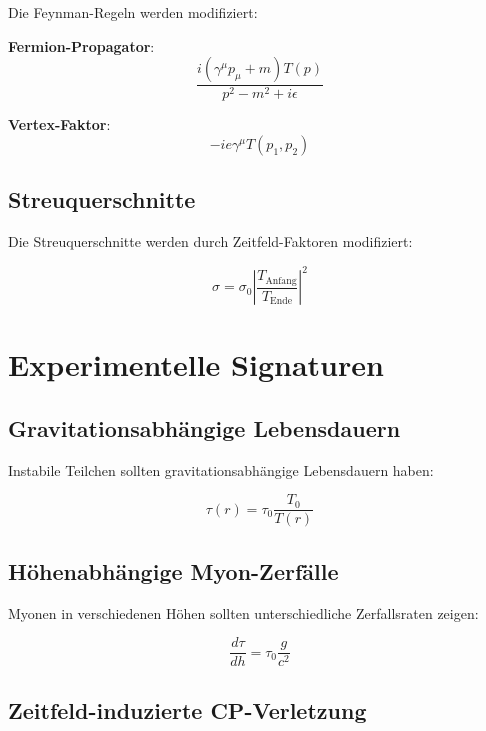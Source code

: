 \documentclass[12pt,a4paper]{report}
\begin{document}
Die Feynman-Regeln werden modifiziert:

\textbf{Fermion-Propagator}:
\begin{equation}
	\frac{i(\gamma^\mu p_\mu + m)T(p)}{p^2 - m^2 + i\epsilon}
\end{equation}

\textbf{Vertex-Faktor}:
\begin{equation}
	-ie\gamma^\mu T(p_1, p_2)
\end{equation}

\subsection{Streuquerschnitte}

Die Streuquerschnitte werden durch Zeitfeld-Faktoren modifiziert:

\begin{equation}
	\sigma = \sigma_0 \left|\frac{T_{\text{Anfang}}}{T_{\text{Ende}}}\right|^2
\end{equation}

\section{Experimentelle Signaturen}

\subsection{Gravitationsabhängige Lebensdauern}

Instabile Teilchen sollten gravitationsabhängige Lebensdauern haben:

\begin{equation}
	\tau(r) = \tau_0 \frac{T_0}{T(r)}
\end{equation}

\subsection{Höhenabhängige Myon-Zerfälle}

Myonen in verschiedenen Höhen sollten unterschiedliche Zerfallsraten zeigen:

\begin{equation}
	\frac{d\tau}{dh} = \tau_0\frac{g}{c^2}
\end{equation}

\subsection{Zeitfeld-induzierte CP-Verletzung}
\end{document}
